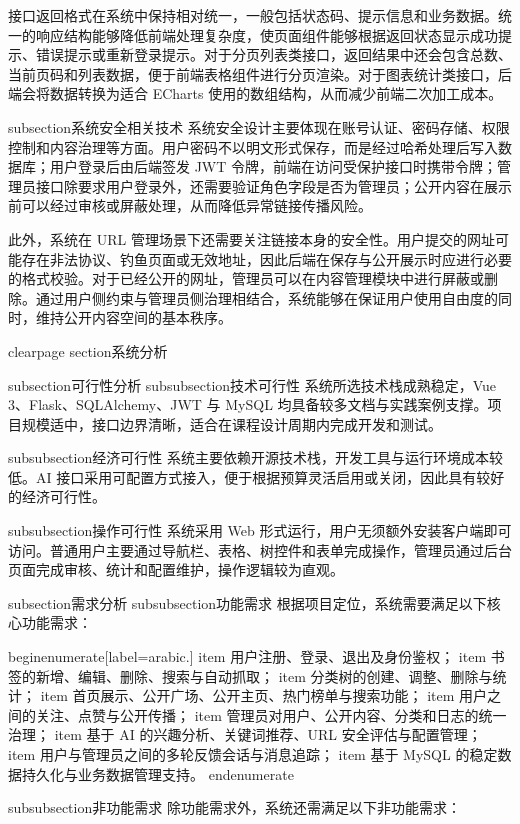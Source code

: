 接口返回格式在系统中保持相对统一，一般包括状态码、提示信息和业务数据。统一的响应结构能够降低前端处理复杂度，使页面组件能够根据返回状态显示成功提示、错误提示或重新登录提示。对于分页列表类接口，返回结果中还会包含总数、当前页码和列表数据，便于前端表格组件进行分页渲染。对于图表统计类接口，后端会将数据转换为适合 ECharts 使用的数组结构，从而减少前端二次加工成本。

subsection{系统安全相关技术}
系统安全设计主要体现在账号认证、密码存储、权限控制和内容治理等方面。用户密码不以明文形式保存，而是经过哈希处理后写入数据库；用户登录后由后端签发 JWT 令牌，前端在访问受保护接口时携带令牌；管理员接口除要求用户登录外，还需要验证角色字段是否为管理员；公开内容在展示前可以经过审核或屏蔽处理，从而降低异常链接传播风险。

此外，系统在 URL 管理场景下还需要关注链接本身的安全性。用户提交的网址可能存在非法协议、钓鱼页面或无效地址，因此后端在保存与公开展示时应进行必要的格式校验。对于已经公开的网址，管理员可以在内容管理模块中进行屏蔽或删除。通过用户侧约束与管理员侧治理相结合，系统能够在保证用户使用自由度的同时，维持公开内容空间的基本秩序。

clearpage
section{系统分析}

subsection{可行性分析}
subsubsection{技术可行性}
系统所选技术栈成熟稳定，Vue 3、Flask、SQLAlchemy、JWT 与 MySQL 均具备较多文档与实践案例支撑。项目规模适中，接口边界清晰，适合在课程设计周期内完成开发和测试。

subsubsection{经济可行性}
系统主要依赖开源技术栈，开发工具与运行环境成本较低。AI 接口采用可配置方式接入，便于根据预算灵活启用或关闭，因此具有较好的经济可行性。

subsubsection{操作可行性}
系统采用 Web 形式运行，用户无须额外安装客户端即可访问。普通用户主要通过导航栏、表格、树控件和表单完成操作，管理员通过后台页面完成审核、统计和配置维护，操作逻辑较为直观。

subsection{需求分析}
subsubsection{功能需求}
根据项目定位，系统需要满足以下核心功能需求：

begin{enumerate}[label=arabic.]
    item 用户注册、登录、退出及身份鉴权；
    item 书签的新增、编辑、删除、搜索与自动抓取；
    item 分类树的创建、调整、删除与统计；
    item 首页展示、公开广场、公开主页、热门榜单与搜索功能；
    item 用户之间的关注、点赞与公开传播；
    item 管理员对用户、公开内容、分类和日志的统一治理；
    item 基于 AI 的兴趣分析、关键词推荐、URL 安全评估与配置管理；
    item 用户与管理员之间的多轮反馈会话与消息追踪；
    item 基于 MySQL 的稳定数据持久化与业务数据管理支持。
end{enumerate}

subsubsection{非功能需求}
除功能需求外，系统还需满足以下非功能需求：

